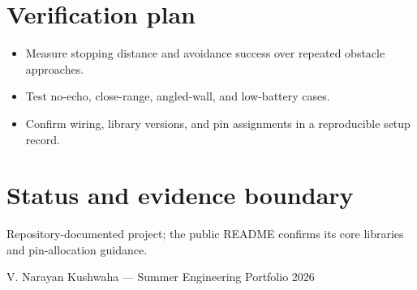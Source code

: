 \documentclass[10pt]{article}
\begin{document}
\section*{Verification plan}
\begin{itemize}
\item Measure stopping distance and avoidance success over repeated obstacle approaches.
\item Test no-echo, close-range, angled-wall, and low-battery cases.
\item Confirm wiring, library versions, and pin assignments in a reproducible setup record.
\end{itemize}

\section*{Status and evidence boundary}
Repository-documented project; the public README confirms its core libraries and pin-allocation guidance.

\vfill
\small\color{muted} V. Narayan Kushwaha --- Summer Engineering Portfolio 2026
\end{document}
